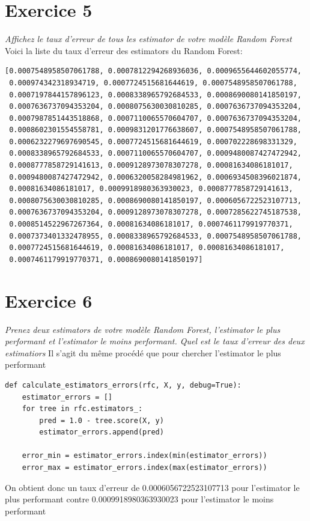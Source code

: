 \documentclass[a4paper, 12pt, oneside]{book}
\begin{document}
\section{Exercice 5}
\textit{Affichez le taux d’erreur de tous les estimator de votre modèle Random Forest}
\newline \newline
Voici la liste du taux d'erreur des estimators du Random Forest:
\begin{verbatim}
[0.0007548958507061788, 0.0007812294268936036, 0.0009655644602055774, 
 0.000974342318934719, 0.0007724515681644619, 0.0007548958507061788, 
 0.0007197844157896123, 0.0008338965792684533, 0.0008690080141850197, 
 0.0007636737094353204, 0.0008075630030810285, 0.0007636737094353204,
 0.0007987851443518868, 0.0007110065570604707, 0.0007636737094353204, 
 0.0008602301554558781, 0.0009831201776638607, 0.0007548958507061788, 
 0.0006232279697690545, 0.0007724515681644619, 0.000702228698331329, 
 0.0008338965792684533, 0.0007110065570604707, 0.0009480087427472942, 
 0.0008777858729141613, 0.0009128973078307278, 0.00081634086181017, 
 0.0009480087427472942, 0.0006320058284981962, 0.0006934508396021874, 
 0.00081634086181017, 0.0009918980363930023, 0.0008777858729141613, 
 0.0008075630030810285, 0.0008690080141850197, 0.0006056722523107713,
 0.0007636737094353204, 0.0009128973078307278, 0.0007285622745187538, 
 0.0008514522967267364, 0.00081634086181017, 0.0007461179919770371, 
 0.0007373401332478955, 0.0008338965792684533, 0.0007548958507061788, 
 0.0007724515681644619, 0.00081634086181017, 0.00081634086181017, 
 0.0007461179919770371, 0.0008690080141850197]
\end{verbatim}



\section{Exercice 6}
\textit{Prenez deux estimators de votre modèle Random Forest, l'estimator le plus performant et l'estimator le moins performant. Quel est le taux d'erreur des deux estimatiors}
\newline \newline
Il s'agit du même procédé que pour chercher l'estimator le plus performant
\begin{verbatim}
def calculate_estimators_errors(rfc, X, y, debug=True):
    estimator_errors = []
    for tree in rfc.estimators_:
        pred = 1.0 - tree.score(X, y)
        estimator_errors.append(pred)

    error_min = estimator_errors.index(min(estimator_errors))
    error_max = estimator_errors.index(max(estimator_errors))
\end{verbatim}
On obtient donc un taux d'erreur de 0.0006056722523107713 pour l'estimator le plus performant contre 0.0009918980363930023 pour l'estimator le moins performant
\end{document}
